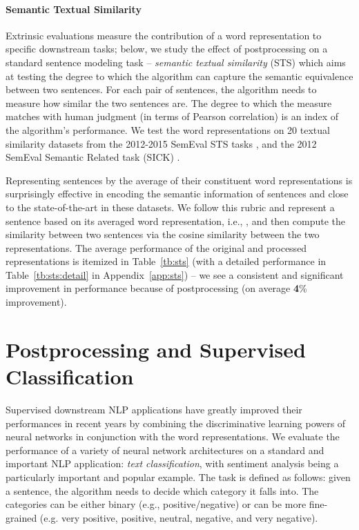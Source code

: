 \documentclass{article} \usepackage{acl2017,times}
\begin{document}
\paragraph{Semantic Textual Similarity}

Extrinsic evaluations measure the contribution of a word representation to specific downstream tasks; below, we study the effect of postprocessing on a standard sentence modeling task --   {\em semantic textual similarity} (STS) which aims at testing the degree to which the algorithm can capture the semantic equivalence between two sentences. For each pair of sentences, the algorithm needs to measure how similar the two sentences are. The degree to which the measure matches with  human judgment (in terms of Pearson correlation) is an index of the algorithm's performance.  
We test the word representations on  20 textual similarity datasets from the 2012-2015 SemEval STS tasks \citep{agirre2012semeval,agirre2013sem,agirre2014semeval,agirrea2015semeval}, and the 2012 SemEval Semantic Related task (SICK) \citep{marelli2014sick}. 

Representing  sentences by the average of their constituent word representations is surprisingly effective in encoding the semantic information of sentences
\citep{wieting2015paraphrase,adi2016fine} and close to the state-of-the-art in these datasets. We follow this rubric and represent a sentence  based on its averaged word representation, i.e., , and then compute the similarity between two sentences via the cosine similarity between the two representations.  
The average performance of the original and processed representations is itemized in Table~\ref{tb:sts} (with a detailed performance in Table~\ref{tb:sts:detail} in Appendix~\ref{app:sts}) -- we see a consistent and significant improvement in performance because of postprocessing (on average {\bf 4}\% improvement).

\section{Postprocessing and Supervised Classification}
Supervised downstream NLP applications have greatly improved their performances  in recent years by combining the discriminative learning powers of neural networks in conjunction with the word  representations. We evaluate the performance of a variety of neural network architectures on a standard and important NLP application: {\em text classification}, with 
 sentiment analysis being a particularly important and popular example. The task is defined as follows: given a sentence, the algorithm needs to decide which category it falls into. The categories can be either binary (e.g., positive/negative) or can be more fine-grained (e.g. very positive, positive, neutral, negative, and very negative). 
\end{document}
